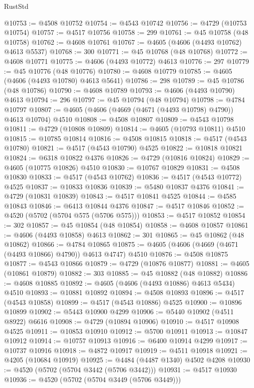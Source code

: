 \begin{lexlean}{RustStd}
\begin{coremodule}
@10753 := @4508 @10752
@10754 := @4543 @10742
@10756 := @4729 (@10753 @10754)
@10757 := @4517 @10756
@10758 := 299
@10761 := @45 @10758 (@48 @10758)
@10762 := @4608 @10761
@10767 := @4605 (@4606 (@4493 @10762) @4613 @5537)
@10768 := 300
@10771 := @45 @10768 (@48 @10768)
@10772 := @4608 @10771
@10775 := @4606 (@4493 @10772) @4613
@10776 := 297
@10779 := @45 @10776 (@48 @10776)
@10780 := @4608 @10779
@10785 := @4605 (@4606 (@4493 @10780) @4613 @5641)
@10786 := 298
@10789 := @45 @10786 (@48 @10786)
@10790 := @4608 @10789
@10793 := @4606 (@4493 @10790) @4613
@10794 := 296
@10797 := @45 @10794 (@48 @10794)
@10798 := @4784 @10797
@10807 := @4605 (@4606 (@4669 (@4671 (@4493 @10798) @4790)) @4613 @10704) @4510
@10808 := @4508 @10807
@10809 := @4543 @10798
@10811 := @4729 (@10808 @10809)
@10814 := @4605 (@10793 @10811) @4510
@10815 := @10785 @10814
@10816 := @4508 @10815
@10818 := @4517 (@4543 @10780)
@10821 := @4517 (@4543 @10790) @4525
@10822 := @10818 @10821
@10824 := @6318 @10822 @4376
@10826 := @4729 (@10816 @10824)
@10829 := @4605 (@10775 @10826) @4510
@10830 := @10767 @10829
@10831 := @4508 @10830
@10833 := @4517 (@4543 @10762)
@10836 := @4517 (@4543 @10772) @4525
@10837 := @10833 @10836
@10839 := @5480 @10837 @4376
@10841 := @4729 (@10831 @10839)
@10843 := @4517 @10841 @4525
@10844 := @4585 @10843
@10846 := @6413 @10844 @4376
@10847 := @4517 @10846
@10852 := @4520 (@5702 (@5704 @575 (@5706 @575)))
@10853 := @4517 @10852
@10854 := 302
@10857 := @45 @10854 (@48 @10854)
@10858 := @4608 @10857
@10861 := @4606 (@4493 @10858) @4613
@10862 := 301
@10865 := @45 @10862 (@48 @10862)
@10866 := @4784 @10865
@10875 := @4605 (@4606 (@4669 (@4671 (@4493 @10866) @4790)) @4613 @4747) @4510
@10876 := @4508 @10875
@10877 := @4543 @10866
@10879 := @4729 (@10876 @10877)
@10881 := @4605 (@10861 @10879)
@10882 := 303
@10885 := @45 @10882 (@48 @10882)
@10886 := @4608 @10885
@10892 := @4605 (@4606 (@4493 @10886) @4613 @5434) @4510
@10893 := @10881 @10892
@10894 := @4508 @10893
@10896 := @4517 (@4543 @10858)
@10899 := @4517 (@4543 @10886) @4525
@10900 := @10896 @10899
@10902 := @5443 @10900 @4299
@10906 := @5440 @10902 (@4511 @8922) @6616
@10908 := @4729 (@10894 @10906)
@10910 := @4517 @10908 @4525
@10911 := @10853 @10910
@10912 := @5700 @10911
@10913 := @10847 @10912
@10914 := @10757 @10913
@10916 := @6400 @10914 @4299
@10917 := @10737 @10916
@10918 := @4872 @10917
@10919 := @4511 @10918
@10921 := @4205 (@10684 @10919)
@10925 := @4484 (@4487 @1340) @4502 @4208
@10930 := @4520 (@5702 (@5704 @3442 (@5706 @3442)))
@10931 := @4517 @10930
@10936 := @4520 (@5702 (@5704 @3449 (@5706 @3449)))

\end{coremodule}
\end{lexlean}
